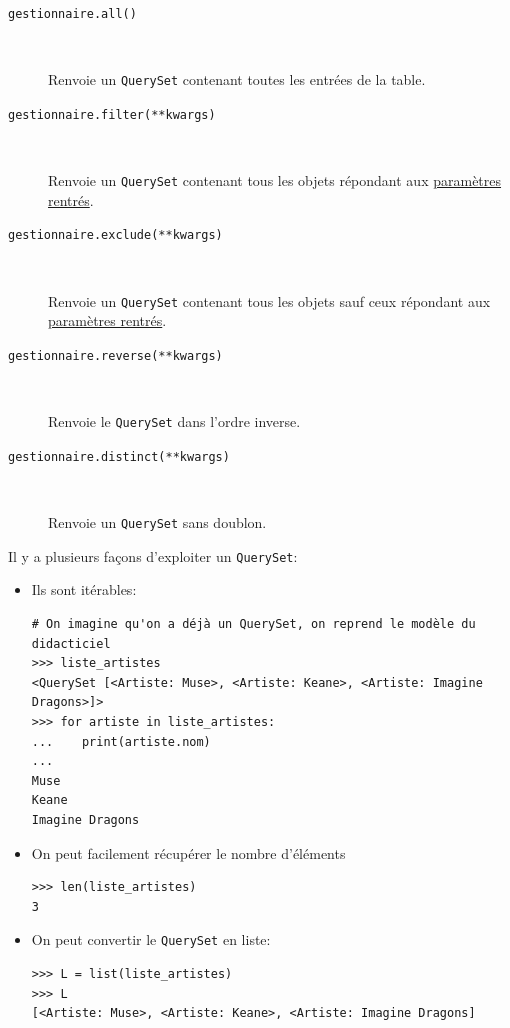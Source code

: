 \documentclass[a4paper, 10pt]{article}
\begin{document}
{\begin{description}
	\item[\texttt{gestionnaire.all()}]~

	      Renvoie un \texttt{QuerySet} contenant toutes les entrées de la table.

	\item[\texttt{gestionnaire.filter(**kwargs)}]~

	      Renvoie un \texttt{QuerySet} contenant tous les objets répondant aux \href{https://docs.djangoproject.com/fr/2.0/ref/models/querysets/#field-lookups}{paramètres rentrés}.

	\item[\texttt{gestionnaire.exclude(**kwargs)}]~

	      Renvoie un \texttt{QuerySet} contenant tous les objets sauf ceux répondant aux \href{https://docs.djangoproject.com/fr/2.0/ref/models/querysets/#field-lookups}{paramètres rentrés}.

	\item[\texttt{gestionnaire.reverse(**kwargs)}]~

	      Renvoie le \texttt{QuerySet} dans l'ordre inverse.

	\item[\texttt{gestionnaire.distinct(**kwargs)}]~

	      Renvoie un \texttt{QuerySet} sans doublon.
\end{description}

Il y a plusieurs façons d'exploiter un \texttt{QuerySet}:
\begin{itemize}
	\item Ils sont itérables:
	      \begin{verbatim}
# On imagine qu'on a déjà un QuerySet, on reprend le modèle du didacticiel
>>> liste_artistes
<QuerySet [<Artiste: Muse>, <Artiste: Keane>, <Artiste: Imagine Dragons>]>
>>> for artiste in liste_artistes:
...    print(artiste.nom)
...
Muse
Keane
Imagine Dragons
    \end{verbatim}

	\item On peut facilement récupérer le nombre d'éléments
	      \begin{verbatim}
>>> len(liste_artistes)
3
    \end{verbatim}

	\item On peut convertir le \texttt{QuerySet} en liste:
	      \begin{verbatim}
>>> L = list(liste_artistes)
>>> L
[<Artiste: Muse>, <Artiste: Keane>, <Artiste: Imagine Dragons]
    \end{verbatim}


\end{itemize}}
\end{document}

